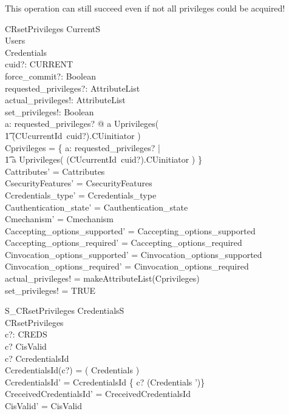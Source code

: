 This operation can still succeed even if not all privileges could be acquired!
\begin{schema}{CRsetPrivileges}
  \Xi CurrentS \\
  \Xi Users \\
  \Delta Credentials \\
  cuid?: CURRENT \\
  force\_commit?: Boolean \\
  requested\_privileges?: AttributeList \\
  actual\_privileges!: AttributeList \\
  set\_privileges!: Boolean \\
  \where
  \exists a: \ran requested\_privileges? @ a \in Uprivileges( \\
  \t1 (CUcurrentId~cuid?).CUinitiator ) \\
  Cprivileges = \{ a: \ran requested\_privileges? | \\
  \t1 a \in Uprivileges( (CUcurrentId~cuid?).CUinitiator ) \} \\
  Cattributes' = Cattributes \\
  CsecurityFeatures' = CsecurityFeatures \\
  Ccredentials\_type' = Ccredentials\_type \\
  Cauthentication\_state' = Cauthentication\_state \\
  Cmechanism' = Cmechanism \\
  Caccepting\_options\_supported' = Caccepting\_options\_supported \\
  Caccepting\_options\_required' = Caccepting\_options\_required \\
  Cinvocation\_options\_supported' = Cinvocation\_options\_supported \\
  Cinvocation\_options\_required' = Cinvocation\_options\_required \\
  actual\_privileges! = makeAttributeList(Cprivileges) \\
  set\_privileges! = TRUE \\
\end{schema}
\begin{schema}{S\_CRsetPrivileges}
  \Delta CredentialsS \\
  CRsetPrivileges \\
  c?: CREDS \\
  \where
  c? \in \dom CisValid \\
  c? \in \dom CcredentialsId \\
  CcredentialsId(c?) = ( \theta Credentials ) \\
  CcredentialsId' = CcredentialsId \oplus \{ c? \mapsto (\theta Credentials ')\} \\
  CreceivedCredentialsId' = CreceivedCredentialsId \\
  CisValid' = CisValid \\
\end{schema}
